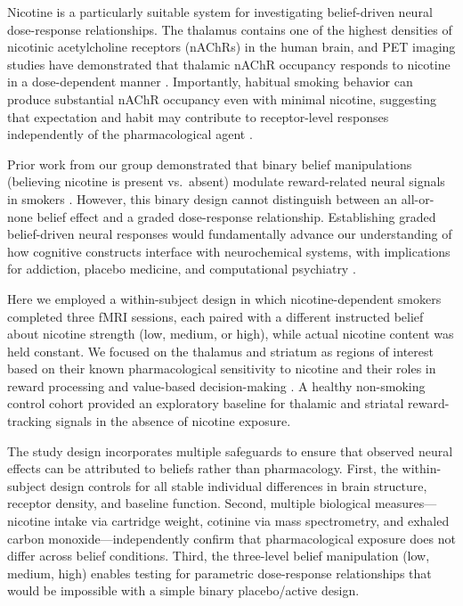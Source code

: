 \documentclass[12pt]{article}
\begin{document}
Nicotine is a particularly suitable system for investigating belief-driven neural dose-response relationships. The thalamus contains one of the highest densities of nicotinic acetylcholine receptors (nAChRs) in the human brain, and PET imaging studies have demonstrated that thalamic nAChR occupancy responds to nicotine in a dose-dependent manner \citep{cosgrove2009imaging, brody2004thalamic}. Importantly, habitual smoking behavior can produce substantial nAChR occupancy even with minimal nicotine, suggesting that expectation and habit may contribute to receptor-level responses independently of the pharmacological agent \citep{picciotto2012acetylcholine}.

Prior work from our group demonstrated that binary belief manipulations (believing nicotine is present vs.\ absent) modulate reward-related neural signals in smokers \citep{gu2015belief}. However, this binary design cannot distinguish between an all-or-none belief effect and a graded dose-response relationship. Establishing graded belief-driven neural responses would fundamentally advance our understanding of how cognitive constructs interface with neurochemical systems, with implications for addiction, placebo medicine, and computational psychiatry \citep{friston2014computational}.

Here we employed a within-subject design in which nicotine-dependent smokers completed three fMRI sessions, each paired with a different instructed belief about nicotine strength (low, medium, or high), while actual nicotine content was held constant. We focused on the thalamus and striatum as regions of interest based on their known pharmacological sensitivity to nicotine and their roles in reward processing and value-based decision-making \citep{kable2009subjective, brody2006nicotine}. A healthy non-smoking control cohort provided an exploratory baseline for thalamic and striatal reward-tracking signals in the absence of nicotine exposure.

The study design incorporates multiple safeguards to ensure that observed neural effects can be attributed to beliefs rather than pharmacology. First, the within-subject design controls for all stable individual differences in brain structure, receptor density, and baseline function. Second, multiple biological measures---nicotine intake via cartridge weight, cotinine via mass spectrometry, and exhaled carbon monoxide---independently confirm that pharmacological exposure does not differ across belief conditions. Third, the three-level belief manipulation (low, medium, high) enables testing for parametric dose-response relationships that would be impossible with a simple binary placebo/active design.
\end{document}
